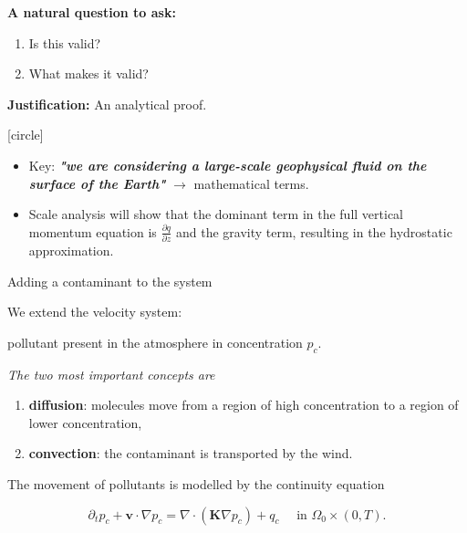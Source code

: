 \documentclass{beamer}
\begin{document}
\begin{frame}

\textbf{A natural question to ask:} 

\begin{enumerate}
  \item Is this valid?
  \item What makes it valid?
\end{enumerate}

\textbf{Justification:} An analytical proof.

[circle]
\begin{itemize}

  \item Key: \textbf{\textit{"we are considering a large-scale geophysical fluid on the surface of the Earth"}} $\to$ mathematical terms.

  \item Scale analysis will show that the dominant term in the full vertical momentum equation is $\frac{\partial q}{\partial z}$ and the gravity term, resulting in the hydrostatic approximation.

\end{itemize}

\end{frame}

\begin{frame}{Adding a contaminant to the system}

We extend the velocity system:
\begin{center}
\textcolor{mediumred-violet}{pollutant present in the atmosphere in concentration $p_c.$}
\end{center}

\textit{The two most important concepts are}

\begin{enumerate}
\item \textbf{diffusion}: molecules move from a region of high concentration to a region of lower concentration,
\item \textbf{convection}: the contaminant is transported by the wind.
\end{enumerate}

The movement of pollutants is modelled by the continuity equation

$$\partial_t p_c + \mathbf{v} \cdot \nabla p_c = \nabla \cdot (\mathbf{K} \nabla p_c) + q_c \quad \text{ in } \Omega_0 \times (0,T). $$

\end{frame}
\end{document}
